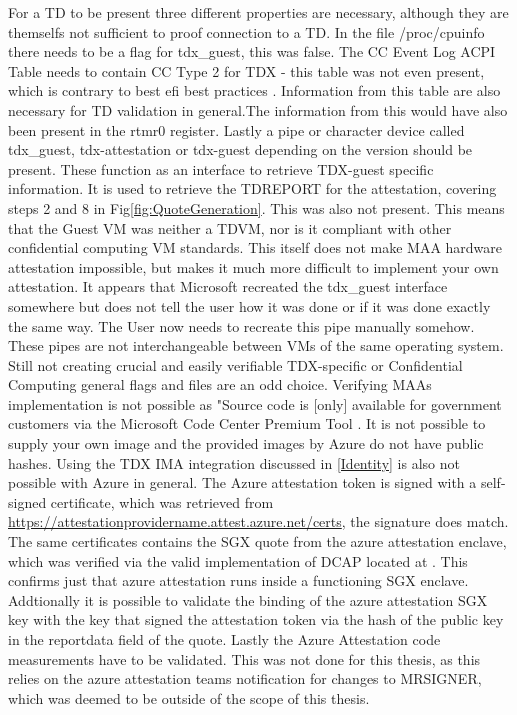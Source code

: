 
\label{Issues-with-azure-td}
For a TD to be present three different properties are necessary, although they are themselfs not sufficient to proof connection to a TD. In the file /proc/cpuinfo there needs to be a flag for tdx\_guest, this was false. The CC Event Log ACPI Table needs to contain CC Type 2 for TDX - this table was not even present, which is contrary to best efi best practices \cite{uefi_forum_inc_acpi_docu_2022}. Information from this table are also necessary for TD validation in general.The information from this would have also been present in the rtmr0 register. Lastly a pipe or character device called tdx\_guest, tdx-attestation or tdx-guest depending on the version should be present. These function as an interface to retrieve TDX-guest specific information\cite{linux_kernel_development_community_tdx_2024}. It is used to retrieve the TDREPORT for the attestation, covering steps 2 and 8 in Fig\ref{fig:QuoteGeneration}.  This was also not present. This means that the Guest VM was neither a TDVM, nor is it compliant with other confidential computing VM standards. This itself does not make MAA hardware attestation impossible, but makes it much more difficult to implement your own attestation. It appears that Microsoft recreated the tdx\_guest interface somewhere but does not tell the user how it was done or if it was done exactly the same way. The User now needs to recreate this pipe manually somehow. These pipes are not interchangeable between VMs of the same operating system. Still not creating crucial and easily verifiable TDX-specific or Confidential Computing general flags and files are an odd choice.
Verifying MAAs implementation is not possible as \guillemotright"Source code is [only] available for government customers via the Microsoft Code Center Premium Tool \guillemotleft \cite{dan_mabee_azure_attestation_2023}. It is not possible to supply your own image and the provided images by Azure do not have public hashes. Using the TDX IMA integration discussed in \ref{Identity} is also not possible with Azure in general.
The Azure attestation token is signed with a self-signed certificate, which was retrieved from \url{https://attestationprovidername.attest.azure.net/certs}, the signature does match. The same certificates contains the SGX quote from the azure attestation enclave, which was verified via the valid implementation of DCAP located at \cite{microsoft_corporation_azure-samplesmicrosoft-azure-attestation_nodate}. This confirms just that azure attestation runs inside a functioning SGX enclave. Addtionally it is possible to validate the binding of the azure attestation SGX key with the key that signed the attestation token via the hash of the public key in the reportdata field of the quote. Lastly the Azure Attestation code measurements have to be validated. This was not done for this thesis, as this relies on the azure attestation teams notification for changes to MRSIGNER, which was deemed to be outside of the scope of this thesis.

